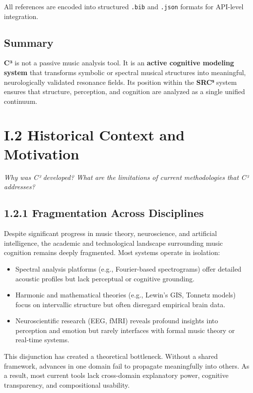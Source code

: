 \documentclass[10pt]{article}
\begin{document}
All references are encoded into structured \texttt{.bib} and \texttt{.json} formats for API-level integration.

\subsection*{Summary}

\textbf{C³} is not a passive music analysis tool. It is an \textbf{active cognitive modeling system} that transforms symbolic or spectral musical structures into meaningful, neurologically validated resonance fields. Its position within the \textbf{SRC⁹} system ensures that structure, perception, and cognition are analyzed as a single unified continuum.

\section*{I.2 Historical Context and Motivation}

\textit{Why was C³ developed? What are the limitations of current methodologies that C³ addresses?}

\subsection*{1.2.1 Fragmentation Across Disciplines}

Despite significant progress in music theory, neuroscience, and artificial intelligence, the academic and technological landscape surrounding music cognition remains deeply fragmented. Most systems operate in isolation:

\begin{itemize}
    \item Spectral analysis platforms (e.g., Fourier-based spectrograms) offer detailed acoustic profiles but lack perceptual or cognitive grounding.
    \item Harmonic and mathematical theories (e.g., Lewin’s GIS, Tonnetz models) focus on intervallic structure but often disregard empirical brain data.
    \item Neuroscientific research (EEG, fMRI) reveals profound insights into perception and emotion but rarely interfaces with formal music theory or real-time systems.
\end{itemize}

This disjunction has created a theoretical bottleneck. Without a shared framework, advances in one domain fail to propagate meaningfully into others. As a result, most current tools lack cross-domain explanatory power, cognitive transparency, and compositional usability.
\end{document}
